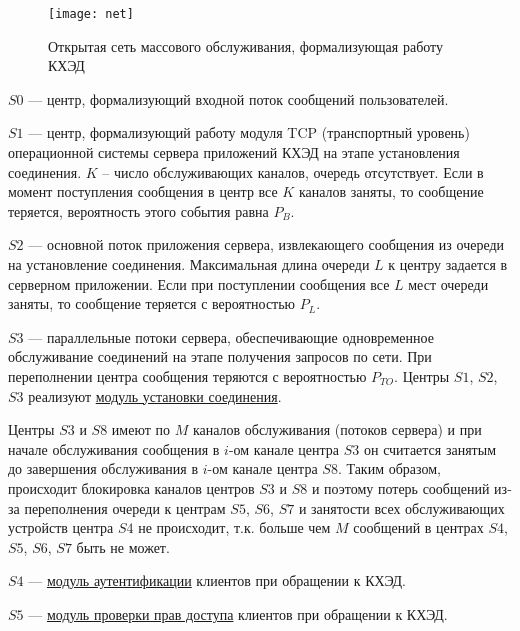 \begin{figure}[h]
  \centering
  \texttt{[image: net]}
  \caption{Открытая сеть массового обслуживания, формализующая работу КХЭД}
  \label{img:net}
\end{figure}

$S0$ --- центр, формализующий входной поток сообщений пользователей.

\vspace{\baselineskip}
$S1$ --- центр, формализующий работу модуля TCP (транспортный уровень) операционной системы сервера приложений КХЭД на этапе установления соединения. $K$ – число обслуживающих каналов, очередь отсутствует. Если в момент поступления сообщения в центр все $K$ каналов заняты, то сообщение теряется, вероятность этого события равна $P_B$.

\vspace{\baselineskip}
$S2$ --- основной поток приложения сервера, извлекающего сообщения из очереди на установление соединения. Максимальная длина очереди $L$ к центру задается в серверном приложении. Если при поступлении сообщения все $L$ мест очереди заняты, то сообщение теряется с вероятностью $P_L$.

\vspace{\baselineskip}
$S3$ --- параллельные потоки сервера, обеспечивающие одновременное обслуживание соединений на этапе получения запросов по сети. При переполнении центра сообщения теряются с вероятностью $P_{TO}$.
Центры $S1$, $S2$, $S3$ реализуют \underline{модуль установки соединения}.

\vspace{\baselineskip}
Центры $S3$ и $S8$ имеют по $M$ каналов обслуживания (потоков сервера) и при начале обслуживания сообщения в $i$-ом канале центра $S3$ он считается занятым до завершения обслуживания в $i$-ом канале центра $S8$. Таким образом, происходит блокировка каналов центров $S3$ и $S8$ и поэтому потерь сообщений из-за переполнения очереди к центрам $S5$, $S6$, $S7$ и занятости всех обслуживающих устройств центра $S4$ не происходит, т.к. больше чем $M$ сообщений в центрах $S4$, $S5$, $S6$, $S7$ быть не может.

\vspace{\baselineskip}
$S4$ --- \underline{модуль аутентификации} клиентов при обращении к КХЭД.

\vspace{\baselineskip}
$S5$ --- \underline{модуль проверки прав доступа} клиентов при обращении к КХЭД.

